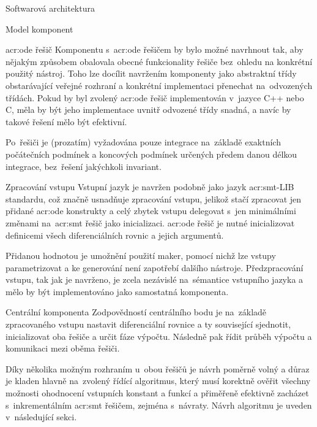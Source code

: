 \documentclass[thesis=M,czech]{FITthesis}[2012/06/26]
\newcommand{\acrlabel}[1]{acr:#1}
\newcommand{\acr}[1]{\acrshort{\acrlabel{#1}}}
\begin{document}
\begin{section}{Softwarová architektura}
\begin{subsection}{Model komponent}
\begin{subsubsection}{\acr{ode} řešič}
Komponentu s~\acr{ode} řešičem
by bylo možné navrhnout tak,
aby nějakým způsobem obalovala
obecné funkcionality řešiče
bez~ohledu na konkrétní použitý nástroj.
Toho lze docílit navržením komponenty
jako abstraktní třídy
obstarávající veřejné rozhraní
a konkrétní implementaci přenechat
na~odvozených třídách.
Pokud by byl zvolený \acr{ode} řešič
implementován v~jazyce C++ nebo C,
měla by být jeho implementace
uvnitř odvozené třídy snadná,
a navíc by takové řešení mělo být efektivní.

Po~řešiči je (prozatím) vyžadována
pouze integrace na~základě
exaktních počátečních podmínek
a koncových podmínek
určených předem danou délkou integrace,
bez~řešení jakýchkoli invariant.
\end{subsubsection} %


\begin{subsubsection}{Zpracování vstupu}\label{sss:design:arch:comp:parse}
Vstupní jazyk je navržen podobně
jako jazyk \acr{smt}-LIB standardu,
což značně usnadňuje zpracování vstupu,
jelikož stačí zpracovat jen přidané \acr{ode} konstrukty
a celý zbytek vstupu delegovat s~jen minimálními změnami
na~\acr{smt} řešič jako inicializaci.
\acr{ode} řešič je nutné inicializovat
definicemi všech diferenciálních rovnic
a jejich argumentů.

Přidanou hodnotou je umožnění použití maker,
pomocí nichž lze vstupy parametrizovat
a ke generování není zapotřebí dalšího nástroje.
Předzpracování vstupu, tak jak je navrženo,
je zcela nezávislé
na~sémantice vstupního jazyka
a mělo by být implementováno jako samostatná komponenta.
\end{subsubsection} %


\begin{subsubsection}{Centrální komponenta}
\label{sss:design:arch:comp:center}
Zodpovědností centrálního bodu je
na~základě zpracovaného vstupu
nastavit diferenciální rovnice
a ty související sjednotit,
inicializovat oba řešiče
a určit fáze výpočtu.
Následně pak řídit
průběh výpočtu
a komunikaci mezi oběma řešiči.

Díky několika možným rozhraním u~obou řešičů
je návrh poměrně volný
a důraz je kladen hlavně na~zvolený řídící algoritmus,
který musí korektně ověřit všechny možnosti
ohodnocení vstupních konstant a funkcí
a přiměřeně efektivně zacházet
s~inkrementálním \acr{smt} řešičem, zejména s~návraty.
Návrh algoritmu je uveden v~následující sekci.
\end{subsubsection} %


\end{subsection}
\end{section}
\end{document}
